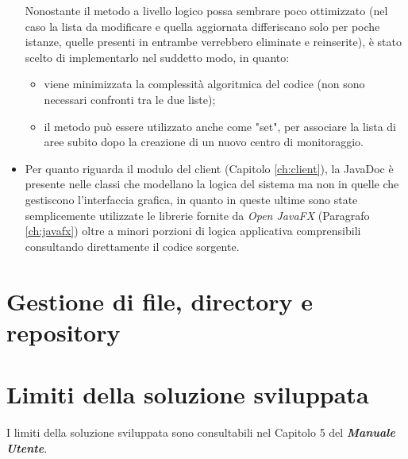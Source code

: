 \begin{itemize}
	Nonostante il metodo a livello logico possa sembrare poco ottimizzato (nel caso la lista da modificare e quella aggiornata differiscano solo per poche istanze, quelle presenti in entrambe verrebbero eliminate e reinserite), è stato scelto di implementarlo nel suddetto modo, in quanto: 
	\begin{itemize}
		\item viene minimizzata la complessità algoritmica del codice (non sono necessari confronti tra le due liste);
		\item il metodo può essere utilizzato anche come "set", per associare la lista di aree subito dopo la creazione di un nuovo centro di monitoraggio.
	\end{itemize}
	\item Per quanto riguarda il modulo del client (Capitolo \ref{ch:client}), la JavaDoc è presente nelle classi che modellano la logica del sistema ma non in quelle che gestiscono l'interfaccia grafica, in quanto in queste ultime sono state semplicemente utilizzate le librerie fornite da \textit{Open JavaFX} (Paragrafo \ref{ch:javafx}) oltre a minori porzioni di logica applicativa comprensibili consultando direttamente il codice sorgente.
\end{itemize}
\chapter{Gestione di file, directory e repository}

\chapter{Limiti della soluzione sviluppata}
I limiti della soluzione sviluppata sono consultabili nel Capitolo 5 del \textit{\textbf{Manuale Utente}}.

\nocite{IuriTex}


